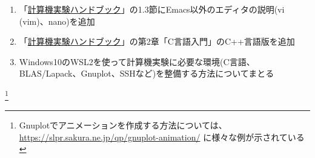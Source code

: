 \documentclass[11pt]{jarticle}
\begin{document}
\begin{enumerate}
\hspace*{-2em} {\bf [その他]}

\item 「\href{https://github.com/utphys-comp/handbook/releases/download/handbook-2019/handbook.pdf}{計算機実験ハンドブック}」の1.3節にEmacs以外のエディタの説明(vi (vim)、nano)を追加

\item 「\href{https://github.com/utphys-comp/handbook/releases/download/handbook-2019/handbook.pdf}{計算機実験ハンドブック}」の第2章「C言語入門」のC++言語版を追加

\item Windows10のWSL2を使って計算機実験に必要な環境(C言語、BLAS/Lapack、Gnuplot、SSHなど)を整備する方法についてまとる

\end{enumerate}  

\renewcommand{\thefootnote}{\fnsymbol{footnote}}
\footnote[0]{Gnuplotでアニメーションを作成する方法については、 \url{https://slpr.sakura.ne.jp/qp/gnuplot-animation/} に様々な例が示されている}
  
\end{document}
